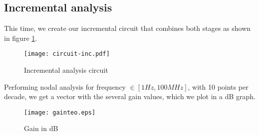 \newpage

\subsection{Incremental analysis}

This time, we create our incremental circuit that combines both stages as shown in figure \ref{fig:circuit-inc}.


\begin{figure}[H] \centering
\texttt{[image: circuit-inc.pdf]}
\caption{Incremental analysis circuit}
\label{fig:circuit-inc}
\end{figure}

Performing nodal analysis for frequency $\in [1Hz, 100MHz]$, with 10 points per decade, we get a vector with the several gain values, which we plot in a dB graph.

\begin{figure}[H] \centering
\texttt{[image: gainteo.eps]}
\caption{Gain in dB}
\label{fig:grafteo}
\end{figure}